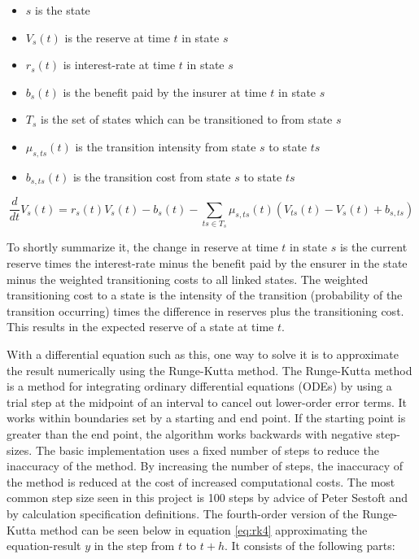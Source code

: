 \begin{itemize}
\item $s$ is the state
\item $V_s(t)$ is the reserve at time $t$ in state $s$
\item $r_s(t)$ is interest-rate at time $t$ in state $s$
\item $b_s(t)$ is the benefit paid by the insurer at time $t$ in state $s$
\item $T_s$ is the set of states which can be transitioned to from state $s$
\item $\mu_{s,ts}(t)$ is the transition intensity from state $s$ to state $ts$
\item $b_{s,ts}(t)$ is the transition cost from state $s$ to state $ts$
\end{itemize}

\begin{equation}\label{eq:thiele}
\frac{d}{dt}V_s(t) = r_s(t) V_s(t) - b_s(t) - \sum_{ts \in T_{s}} \mu_{s,ts}(t) (V_{ts}(t) - V_s(t) + b_{s,ts})
\end{equation}

To shortly summarize it, the change in reserve at time $t$ in state $s$ is the current reserve times the interest-rate minus the benefit paid by the ensurer in the state minus the weighted transitioning costs to all linked states. 
The weighted transitioning cost to a state is the intensity of the transition (probability of the transition occurring) times the difference in reserves plus the transitioning cost.
This results in the expected reserve of a state at time $t$.

With a differential equation such as this, one way to solve it is to approximate the result numerically using the Runge-Kutta method\cite{press2007numerical}.
The Runge-Kutta method is a method for integrating ordinary differential equations (ODEs) by using a trial step at the midpoint of an interval to cancel out lower-order error terms.
It works within boundaries set by a starting and end point. 
If the starting point is greater than the end point, the algorithm works backwards with negative step-sizes.
The basic implementation uses a fixed number of steps to reduce the inaccuracy of the method. 
By increasing the number of steps, the inaccuracy of the method is reduced at the cost of increased computational costs.
The most common step size seen in this project is 100 steps by advice of Peter Sestoft and by calculation specification definitions.
The fourth-order version of the Runge-Kutta method can be seen below in equation \ref{eq:rk4} approximating the equation-result $y$ in the step from $t$ to $t+h$. It consists of the following parts:

